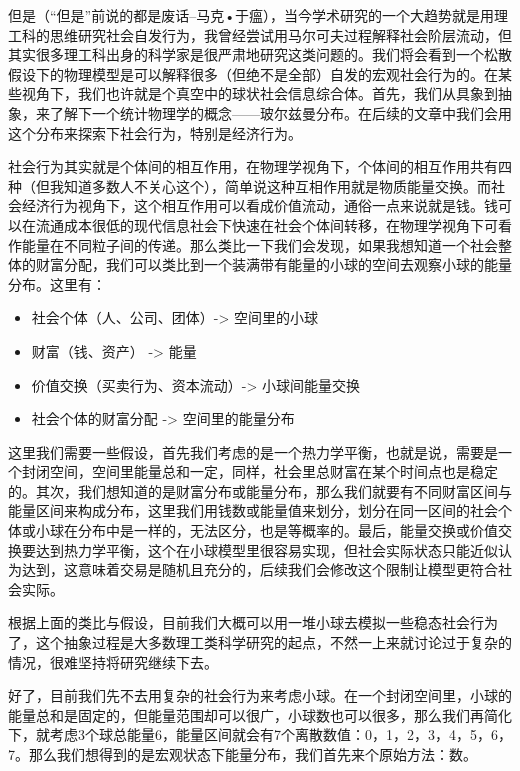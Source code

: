 \documentclass[]{book}
\begin{document}
但是（``但是''前说的都是废话--马克•于瘟），当今学术研究的一个大趋势就是用理工科的思维研究社会自发行为，我曾经尝试用马尔可夫过程解释社会阶层流动，但其实很多理工科出身的科学家是很严肃地研究这类问题的。我们将会看到一个松散假设下的物理模型是可以解释很多（但绝不是全部）自发的宏观社会行为的。在某些视角下，我们也许就是个真空中的球状社会信息综合体。首先，我们从具象到抽象，来了解下一个统计物理学的概念------玻尔兹曼分布。在后续的文章中我们会用这个分布来探索下社会行为，特别是经济行为。

社会行为其实就是个体间的相互作用，在物理学视角下，个体间的相互作用共有四种（但我知道多数人不关心这个），简单说这种互相作用就是物质能量交换。而社会经济行为视角下，这个相互作用可以看成价值流动，通俗一点来说就是钱。钱可以在流通成本很低的现代信息社会下快速在社会个体间转移，在物理学视角下可看作能量在不同粒子间的传递。那么类比一下我们会发现，如果我想知道一个社会整体的财富分配，我们可以类比到一个装满带有能量的小球的空间去观察小球的能量分布。这里有：

\begin{itemize}
\item
  社会个体（人、公司、团体）-\textgreater{} 空间里的小球
\item
  财富（钱、资产） -\textgreater{} 能量
\item
  价值交换（买卖行为、资本流动）-\textgreater{} 小球间能量交换
\item
  社会个体的财富分配 -\textgreater{} 空间里的能量分布
\end{itemize}

这里我们需要一些假设，首先我们考虑的是一个热力学平衡，也就是说，需要是一个封闭空间，空间里能量总和一定，同样，社会里总财富在某个时间点也是稳定的。其次，我们想知道的是财富分布或能量分布，那么我们就要有不同财富区间与能量区间来构成分布，这里我们用钱数或能量值来划分，划分在同一区间的社会个体或小球在分布中是一样的，无法区分，也是等概率的。最后，能量交换或价值交换要达到热力学平衡，这个在小球模型里很容易实现，但社会实际状态只能近似认为达到，这意味着交易是随机且充分的，后续我们会修改这个限制让模型更符合社会实际。

根据上面的类比与假设，目前我们大概可以用一堆小球去模拟一些稳态社会行为了，这个抽象过程是大多数理工类科学研究的起点，不然一上来就讨论过于复杂的情况，很难坚持将研究继续下去。

好了，目前我们先不去用复杂的社会行为来考虑小球。在一个封闭空间里，小球的能量总和是固定的，但能量范围却可以很广，小球数也可以很多，那么我们再简化下，就考虑3个球总能量6，能量区间就会有7个离散数值：0，1，2，3，4，5，6，7。那么我们想得到的是宏观状态下能量分布，我们首先来个原始方法：数。
\end{document}
